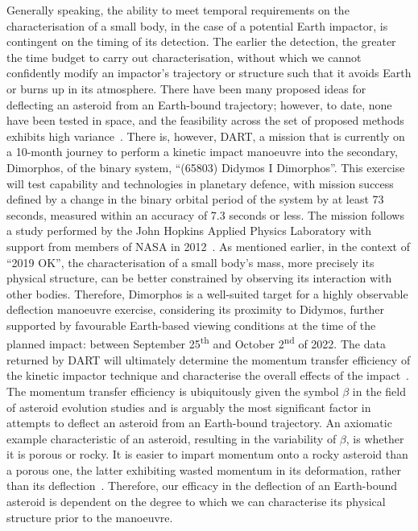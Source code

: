 Generally speaking, the ability to meet temporal requirements on the characterisation of a small body, in the case of a potential Earth impactor, is contingent on the timing of its detection. The earlier the detection, the greater the time budget to carry out characterisation, without which we cannot confidently modify an impactor's trajectory or structure such that it avoids Earth or burns up in its atmosphere. There have been many proposed ideas for deflecting an asteroid from an Earth-bound trajectory; however, to date, none have been tested in space, and the feasibility across the set of proposed methods exhibits high variance~\cite{Harris2015}. There is, however,  \gls{DART}, a mission that is currently on a 10-month journey to perform a kinetic impact manoeuvre into the secondary, Dimorphos, of the binary system, ``(65803) Didymos I Dimorphos''. This exercise will test  capability and technologies in planetary defence, with mission success defined by a change in the binary orbital period of the system by at least 73 seconds, measured within an accuracy of 7.3 seconds or less. The mission follows a study performed by the John Hopkins Applied Physics Laboratory with support from members of \gls{NASA} in 2012~\cite{Cheng2012}. As mentioned earlier, in the context of ``2019 OK'', the characterisation of a small body's mass, more precisely its physical structure, can be better constrained by observing its interaction with other bodies. Therefore, Dimorphos is a well-suited target for a highly observable deflection manoeuvre exercise, considering its proximity to Didymos, further supported by favourable Earth-based viewing conditions at the time of the planned impact: between September 25\textsuperscript{th} and October 2\textsuperscript{nd} of 2022. The data returned by \gls{DART} will ultimately determine the momentum transfer efficiency of the kinetic impactor technique and characterise the overall effects of the impact~\cite{Cheng2012, Rivkin2021}. The momentum transfer efficiency is ubiquitously given the symbol $\beta$ in the field of asteroid evolution studies and is arguably the most significant factor in attempts to deflect an asteroid from an Earth-bound trajectory. An axiomatic example characteristic of an asteroid, resulting in the variability of $\beta$, is whether it is porous or rocky. It is easier to impart momentum onto a rocky asteroid than a porous one, the latter exhibiting wasted momentum in its deformation, rather than its deflection~\cite{Holsapple2012}. Therefore, our efficacy in the deflection of an Earth-bound asteroid is dependent on the degree to which we can characterise its physical structure prior to the manoeuvre.


